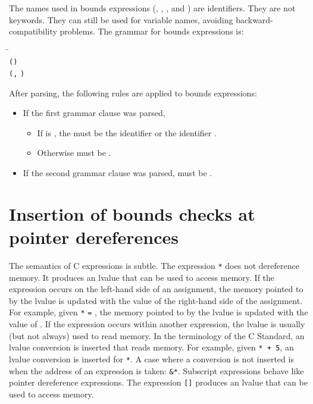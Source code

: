 The names used in bounds expressions (,
, , and ) are identifiers.
They are not keywords.  They can still be used for variable names,
avoiding backward-compatibility problems.    The grammar for
bounds expressions is:
\begin{tabbing}
\= \\
\> \lstinline|(|\lstinline|)| \\
\> \lstinline|(|\lstinline|,|
     \lstinline|)|
\end{tabbing}

After parsing, the following rules are applied to bounds
expressions:
\begin{itemize}
\item If the first grammar clause was parsed,
\begin{itemize}
\item If  is , the 
must be the identifier  or the identifier .
\item Otherwise  must be .
\end{itemize}
\item If the second grammar clause was parsed,  must be
.
\end{itemize}

\section{Insertion of bounds checks at pointer dereferences}

\label{section:bounds-checking-indirections}
The semantics of C expressions is subtle.  The expression
\lstinline|*| does not dereference memory.  It
produces an lvalue that can be used to access memory. If the expression
occurs on the left-hand side of an assignment, the memory pointed to
by the lvalue is updated with the value of the right-hand side of
the assignment.
For example, given \lstinline|*| \lstinline|=| ,
the memory pointed to by the lvalue is updated with the value of .
If the expression occurs within another expression, the lvalue is usually
(but not always)  used to read memory.  In the terminology of the C Standard,
an lvalue conversion is inserted that reads memory. For example, given
\lstinline|*|\lstinline| + 5|,
an lvalue conversion is inserted for \lstinline|*|.  A case where a
conversion is not inserted is  when the address of an expression is taken:
\lstinline|&*|. Subscript expressions behave like pointer
dereference expressions.  The expression \lstinline|[|\lstinline|]| produces
an lvalue that can be used to access memory.

